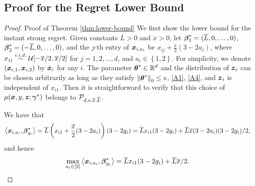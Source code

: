 \subsection{Proof for the Regret Lower Bound}\label{sec:proof-lower}
\begin{proof}{Proof of Theorem \ref{thm:lower-bound}}
	We first show the lower bound for the instant strong regret. Given constants $\overline{L}>0$ and $\overline{x}>0$, let $\boldsymbol{\beta}_{1}^{*}=(\overline{L}, 0, \dots, 0)$, $\boldsymbol{\beta}_2^*=(-\overline{L}, 0, \dots, 0)$, and the $j$-th entry of $\boldsymbol{x}_{i, a_i}$ be $x_{ij} + \frac{\overline{x}}{2}(3- 2a_i)$, where $x_{ij} \stackrel{i.i.d.}{\sim} {\cal U}[-\overline{x}/2, \overline{x}/2]$ for $j=1,2,\dots, d$, and $a_i \in \left\{1, 2\right\}$. For simplicity, we denote $(\boldsymbol{x}_{i, 1}, \boldsymbol{x}_{i, 2})$ by $\boldsymbol{x}_i$ for any $i$. The parameter $\boldsymbol{\theta}^* \in \mathbb{R}^d$ and the distribution of $\boldsymbol{z}_i$ can be chosen arbitrarily as long as they satisfy $\left\lVert\boldsymbol{\theta}^*\right\rVert_0 \leq s$, \ref{A1}, \ref{A4}, and $\boldsymbol{z}_i$ is independent of $x_{i1}$. Then it is straightforward to verify that this choice of $\mu(\boldsymbol{x}, y, \boldsymbol{z};\boldsymbol{\gamma}^*)$ belongs to $ {\cal P}_{d,s,\overline{x},\overline{L}}$. 
	
	We have that 
	\[\left\langle \boldsymbol{x}_{i,a_i}, \boldsymbol{\beta}^*_{g_i} \right\rangle =\overline{L} \left(x_{i1}+\frac{\overline{x}}{2}(3- 2a_i)\right)(3-2g_i)=\overline{L}x_{i1}(3-2g_i)+\overline{L}\overline{x}(3 - 2a_i)(3-2g_i)/2,\] and hence 
	\begin{equation}\label{eq:max-regret-lower}
		\max_{a_i \in [2]}\left\langle \boldsymbol{x}_{i,a_i}, \boldsymbol{\beta}^*_{g_i} \right\rangle =\overline{L}x_{i1}(3-2g_i)+\overline{L}\overline{x}/2.
	\end{equation}
	

\end{proof}
